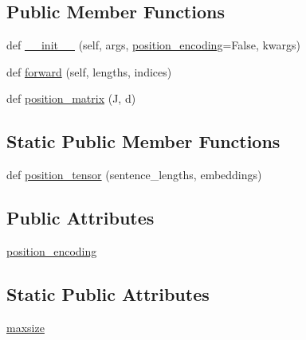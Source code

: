 \subsection*{Public Member Functions}
\begin{DoxyCompactItemize}
\item 
def \hyperlink{classparlai_1_1agents_1_1legacy__agents_1_1memnn_1_1modules__v0_1_1Embed_aee1b369b4a7f6b23788e30e2dc3e439f}{\+\_\+\+\_\+init\+\_\+\+\_\+} (self, args, \hyperlink{classparlai_1_1agents_1_1legacy__agents_1_1memnn_1_1modules__v0_1_1Embed_ac0a34fe405b50e9d36e366d7b3b3913f}{position\+\_\+encoding}=False, kwargs)
\item 
def \hyperlink{classparlai_1_1agents_1_1legacy__agents_1_1memnn_1_1modules__v0_1_1Embed_a4496856f88b3a68d1928ea500041c7c3}{forward} (self, lengths, indices)
\item 
def \hyperlink{classparlai_1_1agents_1_1legacy__agents_1_1memnn_1_1modules__v0_1_1Embed_aac0da7cbc9d64949060c6c681172220f}{position\+\_\+matrix} (J, d)
\end{DoxyCompactItemize}
\subsection*{Static Public Member Functions}
\begin{DoxyCompactItemize}
\item 
def \hyperlink{classparlai_1_1agents_1_1legacy__agents_1_1memnn_1_1modules__v0_1_1Embed_a40a4aebba88622f6734725da0a1fd12d}{position\+\_\+tensor} (sentence\+\_\+lengths, embeddings)
\end{DoxyCompactItemize}
\subsection*{Public Attributes}
\begin{DoxyCompactItemize}
\item 
\hyperlink{classparlai_1_1agents_1_1legacy__agents_1_1memnn_1_1modules__v0_1_1Embed_ac0a34fe405b50e9d36e366d7b3b3913f}{position\+\_\+encoding}
\end{DoxyCompactItemize}
\subsection*{Static Public Attributes}
\begin{DoxyCompactItemize}
\item 
\hyperlink{classparlai_1_1agents_1_1legacy__agents_1_1memnn_1_1modules__v0_1_1Embed_ab1dcd9286ae9605d47d10760a1ed1676}{maxsize}
\end{DoxyCompactItemize}


